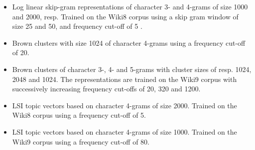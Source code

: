 \begin{itemize}
\item Log linear skip-gram representations of character 3- and 4-grams of size 1000 and 2000, resp. 
Trained on the Wiki8 corpus using a skip gram window of size 25 and 50, and frequency cut-off of 5 .
\item Brown clusters with size 1024 of character 4-grams using a frequency cut-off of 20.
\item Brown clusters of character 3-, 4- and 5-grams with cluster sizes of resp. 1024, 2048 and 1024.
The representations are trained on the Wiki9 corpus with successively increasing frequency cut-offs of 20, 320 and 1200.
\item LSI topic vectors based on character 4-grams of size 2000.   Trained on the Wiki8 corpus using a frequency cut-off of 5.
\item LSI topic vectors based on character 4-grams of size 1000. Trained on the Wiki9 corpus using a frequency cut-off of 80.
\end{itemize}

